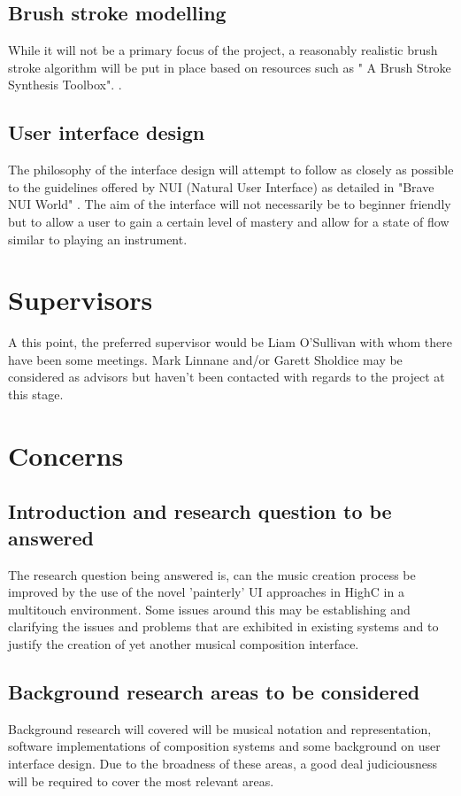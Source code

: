 \documentclass[a4paper,twoside,twocolumn]{article}
\begin{document}
\subsection{Brush stroke modelling}
\label{sec:org085c0f4}
While it will not be a primary focus of the project, a reasonably realistic brush stroke algorithm will be put in place based on resources such as "
A Brush Stroke Synthesis Toolbox". \cite{diverdi_brush_2013}.

\subsection{User interface design}
\label{sec:orgdc2a532}
The philosophy of the interface design will attempt to follow as closely as possible to the guidelines offered by NUI (Natural User Interface) as detailed in "Brave NUI World" \cite{wigdor_brave_2011}. The aim of the interface will not necessarily be to beginner friendly but to allow a user to gain a certain level of mastery and allow for a state of flow similar to playing an instrument. 

\section{Supervisors}
\label{sec:org3fb01a9}
A this point, the preferred supervisor would be Liam O'Sullivan with whom there have been some meetings. Mark Linnane and/or Garett Sholdice may be considered as advisors but haven't been contacted with regards to the project at this stage.

\section{Concerns}
\label{sec:orga0e586d}
\subsection{Introduction and research question to be answered}
\label{sec:org98719e6}
The research question being answered is, can the music creation process be improved by the use of the novel 'painterly' UI approaches in HighC in a multitouch environment. Some issues around this may be establishing and clarifying the issues and problems that are exhibited in existing systems and to justify the creation of yet another musical composition interface. 

\subsection{Background research areas to be considered}
\label{sec:org1c73600}
Background research will covered will be musical notation and representation, software implementations of composition systems and some background on user interface design. Due to the broadness of these areas, a good deal judiciousness will be required to cover the most relevant areas. 
\end{document}
